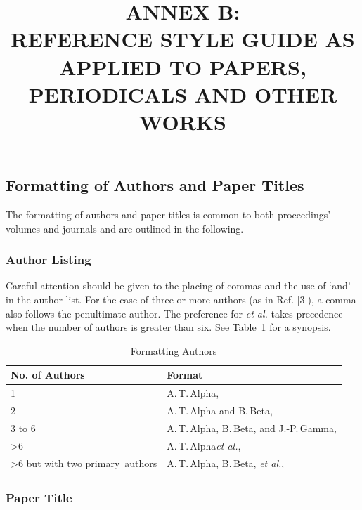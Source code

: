 \documentclass[%
               hyphens,       %
               ]{jacow}
\begin{document}
\title{ANNEX B: \\
		REFERENCE STYLE GUIDE AS APPLIED TO  PAPERS, \\
		PERIODICALS AND OTHER WORKS\\[-\baselineskip]}
\author{}
\maketitle


\subsection{Formatting of Authors and Paper Titles}

The formatting of authors and paper titles is common to both proceedings’ volumes and journals and are outlined in the following.

\subsubsection{Author Listing}

Careful attention should be given to the placing of commas and the use of ‘and’ in the author list. For the case of three or more authors (as in Ref. [3]), a comma also follows the penultimate author. The preference for \textit{et al.} takes precedence when the number of authors is greater than six. See Table~\ref{tab:author-formatting} for a synopsis.
\begin{table}[!hbt]
   \centering
   \caption{Formatting Authors}
   \setlength\tabcolsep{2.5pt}
   \begin{tabular}{p{25mm}l}
       \toprule
       \textbf{No. of Authors} & \textbf{Format} \\ 
       \midrule
           1		& A.\,T.\,Alpha,                  			\\
           2		& A.\,T.\,Alpha and B.\,Beta,					\\
           3 to 6	& A.\,T.\,Alpha, B.\,Beta, and J.-P.\,Gamma,	\\ 
           >6		& A.\,T.\,Alpha\textit{et al.},				\\ 
           >6\,\,but\,\,with\,\,two \hphantom{>6 }\mbox{primary authors} 
           			& A.\,T.\,Alpha, B.\,Beta, \textit{et al.}, 	\\
       \bottomrule
   \end{tabular}
   \label{tab:author-formatting}
\end{table}

\subsubsection{Paper Title}
\end{document}
